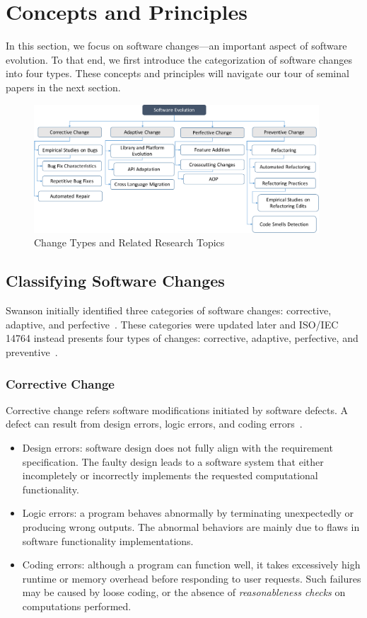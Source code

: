 \documentclass[runningheads,a4paper]{llncs}
\begin{document}
\section{Concepts and Principles}
\label{sec:concepts}

In this section, we focus on software changes---an important aspect of software evolution. To that end, we first introduce the categorization of software changes into four types. These concepts and principles will navigate our tour of seminal papers in the next section.

\begin{figure}[ht]
 \centering
 \includegraphics[width=0.95\textwidth]{images/ChangeTypesTopics.pdf}
 \caption{Change Types and Related Research Topics} 
 \label{fig:changetypetopic}
\end{figure}


\subsection{Classifying Software Changes}
\label{sec:classification} 
Swanson initially identified three categories of software changes: corrective, adaptive, and perfective~\cite{Swanson1976:Dimension}. These categories were updated later and ISO/IEC 14764 instead presents four types of changes: corrective, adaptive, perfective, and preventive~\cite{iso}.

\subsubsection{Corrective Change} 
Corrective change refers software modifications initiated by software defects. A defect can result from design errors, logic errors, and coding errors~\cite{Longstreet1990:smc}.

\begin{itemize}
\item Design errors: software design does not fully align with the requirement specification. The faulty design leads to a software system that either incompletely or incorrectly implements the requested computational functionality. 
\item Logic errors: a program behaves abnormally by terminating unexpectedly or producing wrong outputs. The abnormal behaviors are mainly due to flaws in software functionality implementations.
\item Coding errors: although a program can function well, it takes excessively high runtime or memory overhead before responding to user requests. Such failures may be caused by loose coding, or the absence of {\em reasonableness checks} on computations performed.
\end{itemize}
\end{document}
